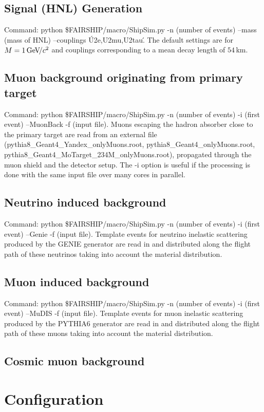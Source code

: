 \documentclass[12pt,a4paper]{article}
\begin{document}
\subsection{Signal (HNL) Generation}
Command: python \$FAIRSHIP/macro/ShipSim.py -n (number of events) --mass (mass of HNL) --couplings \'U2e,U2mu,U2tau\'. The default settings are for $M=1{\mathrm{\,Ge\kern -0.1em V\!/}c^2}$ and couplings corresponding to a mean decay length of $54\,$km. 
 
\subsection{Muon background originating from primary target}
Command: python \$FAIRSHIP/macro/ShipSim.py -n (number of events) -i (first event) --MuonBack -f (input file). Muons escaping the hadron absorber close to the primary target are read from an external file (pythia8\_Geant4\_Yandex\_onlyMuons.root, pythia8\_Geant4\_onlyMuons.root,  pythia8\_Geant4\_MoTarget\_234M\_onlyMuons.root), propagated through the muon shield and the detector setup. The -i option is useful if the processing is done with the same input file over many cores in parallel.

\subsection{Neutrino induced background}
Command: python \$FAIRSHIP/macro/ShipSim.py -n (number of events) -i (first event) --Genie -f (input file). Template events for neutrino inelastic scattering produced by the GENIE generator are read in and distributed along the flight path of these neutrinos taking into account the material distribution. 

\subsection{Muon induced background}
Command: python \$FAIRSHIP/macro/ShipSim.py -n (number of events) -i (first event) --MuDIS -f (input file). Template events for muon inelastic scattering produced by the PYTHIA6 generator are read in and distributed along the flight path of these muons taking into account the material distribution. 

\subsection{Cosmic muon background}

\section{Configuration}
\end{document}
